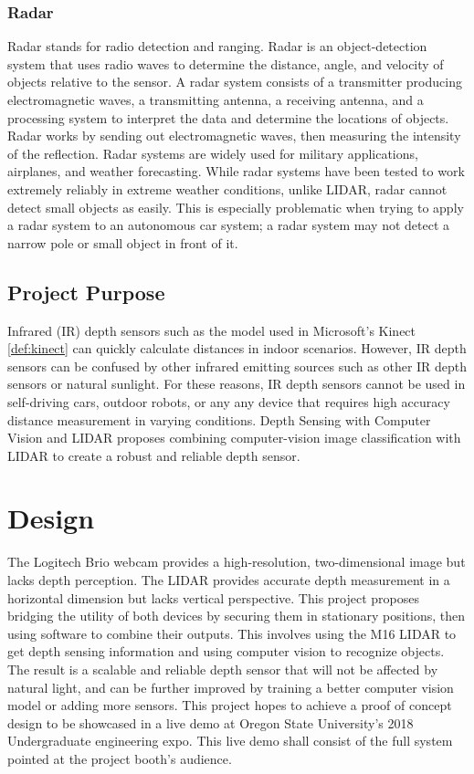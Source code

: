\documentclass[onecolumn, draftclsnofoot,10pt, compsoc]{IEEEtran}
\begin{document}
\begin{singlespace}
		\subsubsection{Radar}
			Radar stands for radio detection and ranging.
			Radar is an object-detection system that uses radio waves to determine the distance, angle, and velocity of objects relative to the sensor.
			A radar system consists of a transmitter producing electromagnetic waves, a transmitting antenna, a receiving antenna, and a processing system to interpret the data and determine the locations of objects.
			Radar works by sending out electromagnetic waves, then measuring the intensity of the reflection. 
			Radar systems are widely used for military applications, airplanes, and weather forecasting.
			While radar systems have been tested to work extremely reliably in extreme weather conditions, unlike LIDAR, radar cannot detect small objects as easily. 
			This is especially problematic when trying to apply a radar system to an autonomous car system; a radar system may not detect a narrow pole or small object in front of it. \cite{aus}


	\subsection{Project Purpose}
		Infrared (IR) depth sensors such as the model used in Microsoft's Kinect \ref{def:kinect} can quickly calculate distances in indoor scenarios.
		However, IR depth sensors can be confused by other infrared emitting sources such as other IR depth sensors or natural sunlight.
		For these reasons, IR depth sensors cannot be used in self-driving cars, outdoor robots, or any any device that requires high accuracy distance measurement in varying conditions.
		Depth Sensing with Computer Vision and LIDAR proposes combining computer-vision image classification with LIDAR to create a robust and reliable depth sensor.

	\section{Design}
		The Logitech Brio webcam provides a high-resolution, two-dimensional image but lacks depth perception.
		The LIDAR provides accurate depth measurement in a horizontal dimension but lacks vertical perspective.
		This project proposes bridging the utility of both devices by securing them in stationary positions, then using software to combine their outputs.
		This involves using the M16 LIDAR to get depth sensing information and using computer vision to recognize objects.
		The result is a scalable and reliable depth sensor that will not be affected by natural light, and can be further improved by training a better computer vision model or adding more sensors.
		This project hopes to achieve a proof of concept design to be showcased in a live demo at Oregon State University's 2018 Undergraduate engineering expo.			
		This live demo shall consist of the full system pointed at the project booth's audience. 


\end{singlespace}
\end{document}
